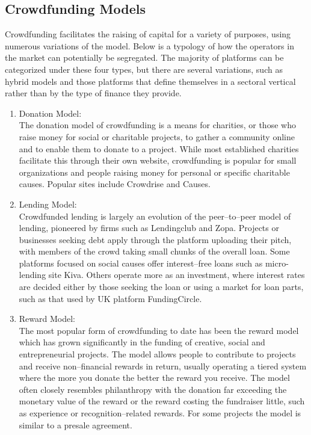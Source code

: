 \subsection*{ Crowdfunding Models}
Crowdfunding facilitates the raising of capital for a variety of purposes, using numerous variations of the model. Below is a typology of how the operators in the market can potentially be segregated. The majority of platforms can be categorized under these four types, but there are several variations, such as hybrid models and those platforms that define themselves in a sectoral vertical rather than by the type of finance they provide.
\begin{enumerate}
      \item Donation Model:\\
            The donation model of crowdfunding is a means for charities, or those who raise money for social or charitable projects, to gather a community online and to enable them to donate to a project. While most established charities facilitate this through their own website, crowdfunding is popular for small organizations and people raising money for personal or specific charitable causes. Popular sites include Crowdrise and Causes.
      \item Lending Model:\\
            Crowdfunded lending is largely an evolution of the peer–to–peer model of lending, pioneered by firms such as Lendingclub and Zopa. Projects or businesses seeking debt apply through the platform uploading their pitch, with members of the crowd taking small chunks of the overall loan. Some platforms focused on social causes offer interest–free loans such as micro-lending site Kiva. Others operate more as an investment, where interest rates are decided either by those seeking the loan or using a market for loan parts, such as that used by UK platform FundingCircle.
      \item Reward Model:\\
            The most popular form of crowdfunding to date has been the reward model which has grown significantly in the funding of creative, social and entrepreneurial projects.
            The model allows people to contribute to projects and receive non–financial rewards in return, usually operating a tiered system where the more you donate the better the reward you receive. The model often closely resembles philanthropy with the donation far exceeding the monetary value of the reward or the reward costing the fundraiser little, such as experience or recognition–related rewards. For some projects the model is similar to a presale agreement.

\end{enumerate}
